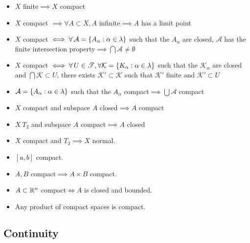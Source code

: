 \documentclass[letterpaper,12pt,fleqn]{article}
\newcommand{\T}{\mathscr{T}}
\newcommand{\A}{\mathcal{A}}
\newcommand{\K}{\mathcal{K}}
\renewcommand{\a}{\alpha}
\renewcommand{\l}{\lambda}
\begin{document}
\begin{itemize}
\item \(X\) finite\(\implies X\) compact

\item \(X\) compact \(\implies\forall A\subset X,A\) infinite\(\implies A\) has a limit point

\item \(X\) compact \(\iff\forall\,\A=\set{A_{\a}:\a\in\l}\) such that the \(A_{\a}\) are closed, \(\A\) has the finite
  intersection property\(\implies\bigcap\A\ne\emptyset\)

\item \(X\) compact \(\iff\forall\,U\in\T,\forall\K=\set{K_{\a}:\a\in\l}\) such that the \(\K_{\a}\) are closed and
  \(\bigcap\K\subset U\), there exists \(\K'\subset\K\) such that \(\K'\) finite and \(\K'\subset U\)

\item \(\A=\set{A_{\a}:\a\in\l}\) such that the \(A_{\a}\) compact\(\implies\bigcup\A\) compact

\item \(X\) compact and subspace \(A\) closed\(\implies A\) compact

\item \(X\ T_2\) and subspace \(A\) compact\(\implies A\) closed

\item \(X\) compact and \(T_2\implies X\) normal.

\item \([a,b]\) compact.

\item \(A,B\) compact\(\implies A\times B\) compact.

\item \(A\subset\mathbb{R}^n\) compact\(\iff A\) is closed and bounded.

\item Any product of compact spaces is compact.
\end{itemize}

\subsection*{Continuity}
\end{document}
